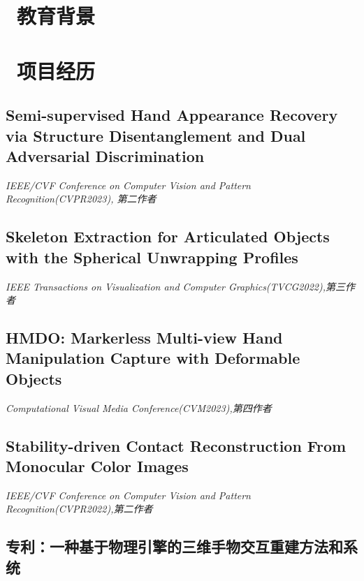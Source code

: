 \documentclass{resume}
\begin{document}



\section{\faGraduationCap\ 教育背景}
\vspace{2mm}

\section{\faUsers\ 项目经历}
\subsection{\textbf{Semi-supervised Hand Appearance Recovery via Structure Disentanglement and Dual Adversarial Discrimination}}
\textit{IEEE/CVF Conference on Computer Vision and Pattern Recognition(CVPR2023), 第二作者}

\subsection{\textbf{Skeleton Extraction for Articulated Objects with the Spherical Unwrapping Profiles}}
\textit{IEEE Transactions on Visualization and Computer Graphics(TVCG2022),第三作者}

\subsection{\textbf{HMDO: Markerless Multi-view Hand Manipulation Capture with Deformable Objects}}
\textit{Computational Visual Media Conference(CVM2023),第四作者}

\subsection{\textbf{Stability-driven Contact Reconstruction From Monocular Color Images}}
\textit{IEEE/CVF Conference on Computer Vision and Pattern Recognition(CVPR2022),第二作者}

\subsection{\textbf{专利：一种基于物理引擎的三维手物交互重建方法和系统}}
\vspace{2mm}
\end{document}

